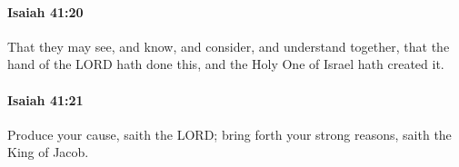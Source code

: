 		\paragraph{Isaiah 41:20} %
			\label{ISAIAH-41-20}

			That they may see, and know, and consider, and understand together, that the hand of the LORD hath done this, and the Holy One of Israel hath created it.


		\paragraph{Isaiah 41:21} %
			\label{ISAIAH-41-21}

			Produce your cause, saith the LORD; bring forth your strong reasons, saith the King of Jacob.


